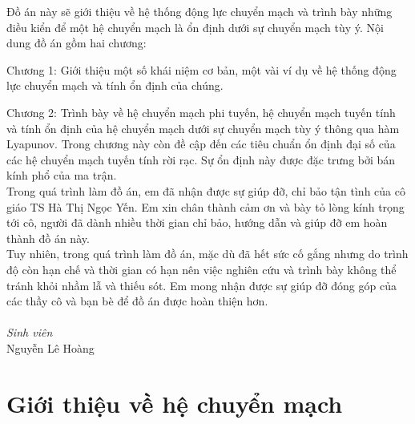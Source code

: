 \documentclass[14pt,a4paper,oneside]{report}		%
\theoremstyle{definition}
\begin{document}
Đồ án này sẽ giới thiệu về hệ thống động lực chuyển mạch và trình bày những điều kiển để một hệ chuyển mạch là ổn định dưới sự chuyển mạch tùy ý. Nội dung đồ án gồm hai chương:

Chương 1: Giới thiệu một số khái niệm cơ bản, một vài ví dụ về hệ thống động lực chuyển mạch và tính ổn định của chúng.

Chương 2: Trình bày về hệ chuyển mạch phi tuyến, hệ chuyển mạch tuyến tính và tính ổn định của hệ chuyển mạch dưới sự chuyển mạch tùy ý thông qua hàm Lyapunov. Trong chương này còn đề cập đến các tiêu chuẩn ổn định đại số của các hệ chuyển mạch tuyến tính rời rạc. Sự ổn định này được đặc trưng bởi bán kính phổ của ma trận.\\

Trong quá trình làm đồ án, em đã nhận được sự giúp đỡ, chỉ bảo tận tình của cô giáo TS Hà Thị Ngọc Yến. Em xin chân thành cảm ơn và bày tỏ lòng kính trọng tới cô, người đã dành nhiều thời gian chỉ bảo, hướng dẫn và giúp đỡ em hoàn thành đồ án này.\\
Tuy nhiên, trong quá trình làm đồ án, mặc dù đã hết sức cố gắng nhưng do trình độ còn hạn chế và thời gian có hạn nên việc nghiên cứu và trình bày không thể tránh khỏi nhầm lẫ và thiếu sót. Em mong nhận được sự giúp đỡ đóng góp của các thầy cô và bạn bè để đồ án được hoàn thiện hơn.\\\\
\textit{Sinh viên}\\
Nguyễn Lê Hoàng

\chapter{Giới thiệu về hệ chuyển mạch}
\end{document}
